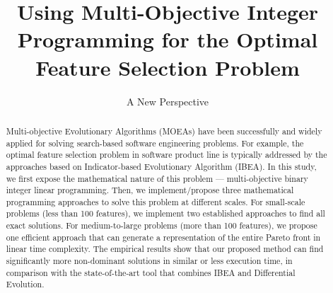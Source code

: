 \documentclass[sigconf]{acmart}
\begin{document}
\title{Using Multi-Objective Integer Programming for the Optimal Feature Selection Problem}
\subtitle{A New Perspective}


%
\renewcommand{\shortauthors}{Anonymous  et al.}


\begin{abstract}
Multi-objective Evolutionary Algorithms (MOEAs) have been successfully and widely applied for solving search-based software engineering problems. For example, the optimal feature selection problem in software product line is typically addressed by the approaches based on Indicator-based Evolutionary Algorithm (IBEA). In this study, we first expose the mathematical nature of this problem --- multi-objective binary integer linear programming. Then, we implement/propose three mathematical programming approaches to solve this problem at different scales. For small-scale problems (less than 100 features), we implement two established approaches to find all exact solutions. For medium-to-large problems (more than 100 features), we propose one efficient approach that can generate a representation of the entire Pareto front in linear time complexity. The empirical results show that our proposed method can find significantly more non-dominant solutions in similar or less execution time, in comparison with the state-of-the-art tool that combines IBEA and Differential Evolution.%
\end{abstract}
\end{document}
